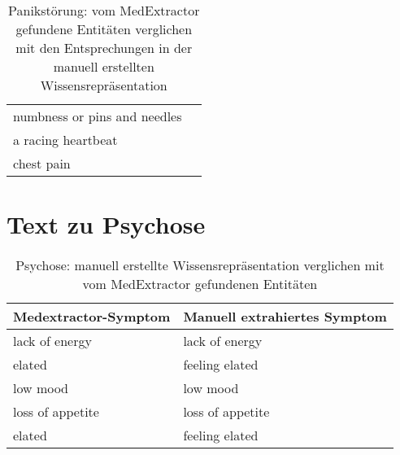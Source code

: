 \begin{table}[H]
\begin{center}
\begin{tabular}{ll}
                  numbness or pins and needles &                     \\
                            a racing heartbeat &                     \\
                                    chest pain &                     \\
\bottomrule
\end{tabular}
\caption{Panikstörung: vom MedExtractor gefundene Entitäten verglichen mit den Entsprechungen in der manuell erstellten Wissensrepräsentation}
\label{tab:panicdisorder_medextractor_manuell}
\end{center}
\end{table}

\section{Text zu Psychose}
\label{sec:psychosis} 

\begin{table}[H]
\begin{center}
\begin{tabular}{ll}
\toprule
  Medextractor-Symptom &                       Manuell extrahiertes Symptom \\
\midrule
       lack of energy &   lack of energy \\
              elated &   feeling elated \\
            low mood &         low mood \\
    loss of appetite & loss of appetite \\
              elated &   feeling elated \\
\bottomrule
\end{tabular}
\caption{Psychose: manuell erstellte Wissensrepräsentation verglichen mit vom MedExtractor gefundenen Entitäten}
\label{tab:psychosis_vergleich_manuell_medextractor}
\end{center}
\end{table}


